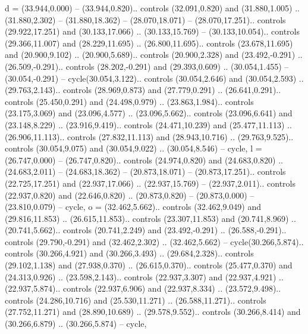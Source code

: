 {d} = {(33.944,0.000) -- (33.944,0.820).. controls (32.091,0.820) and (31.880,1.005) .. (31.880,2.302) -- (31.880,18.362) -- (28.070,18.071) -- (28.070,17.251).. controls (29.922,17.251) and (30.133,17.066) .. (30.133,15.769) -- (30.133,10.054).. controls (29.366,11.007) and (28.229,11.695) .. (26.800,11.695).. controls (23.678,11.695) and (20.900,9.102) .. (20.900,5.689).. controls (20.900,2.328) and (23.492,-0.291) .. (26.509,-0.291).. controls (28.202,-0.291) and (29.393,0.609) .. (30.054,1.455) -- (30.054,-0.291) -- cycle(30.054,3.122).. controls (30.054,2.646) and (30.054,2.593) .. (29.763,2.143).. controls (28.969,0.873) and (27.779,0.291) .. (26.641,0.291).. controls (25.450,0.291) and (24.498,0.979) .. (23.863,1.984).. controls (23.175,3.069) and (23.096,4.577) .. (23.096,5.662).. controls (23.096,6.641) and (23.148,8.229) .. (23.916,9.419).. controls (24.471,10.239) and (25.477,11.113) .. (26.906,11.113).. controls (27.832,11.113) and (28.943,10.716) .. (29.763,9.525).. controls (30.054,9.075) and (30.054,9.022) .. (30.054,8.546) -- cycle},
{l} = {(26.747,0.000) -- (26.747,0.820).. controls (24.974,0.820) and (24.683,0.820) .. (24.683,2.011) -- (24.683,18.362) -- (20.873,18.071) -- (20.873,17.251).. controls (22.725,17.251) and (22.937,17.066) .. (22.937,15.769) -- (22.937,2.011).. controls (22.937,0.820) and (22.646,0.820) .. (20.873,0.820) -- (20.873,0.000) -- (23.810,0.079) -- cycle},
{o} = {(32.462,5.662).. controls (32.462,9.049) and (29.816,11.853) .. (26.615,11.853).. controls (23.307,11.853) and (20.741,8.969) .. (20.741,5.662).. controls (20.741,2.249) and (23.492,-0.291) .. (26.588,-0.291).. controls (29.790,-0.291) and (32.462,2.302) .. (32.462,5.662) -- cycle(30.266,5.874).. controls (30.266,4.921) and (30.266,3.493) .. (29.684,2.328).. controls (29.102,1.138) and (27.938,0.370) .. (26.615,0.370).. controls (25.477,0.370) and (24.313,0.926) .. (23.598,2.143).. controls (22.937,3.307) and (22.937,4.921) .. (22.937,5.874).. controls (22.937,6.906) and (22.937,8.334) .. (23.572,9.498).. controls (24.286,10.716) and (25.530,11.271) .. (26.588,11.271).. controls (27.752,11.271) and (28.890,10.689) .. (29.578,9.552).. controls (30.266,8.414) and (30.266,6.879) .. (30.266,5.874) -- cycle},
